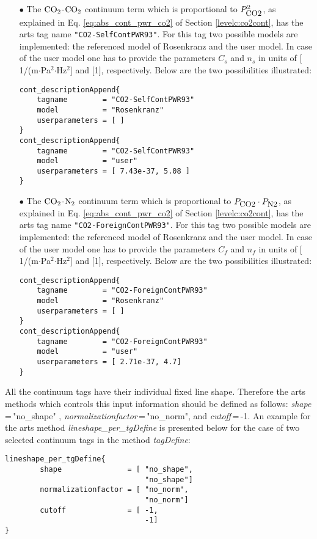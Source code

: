 {\begin{itemize}
\item[$\bullet$] The \cite{pwr:93} $\mbox{CO}_2$-$\mbox{CO}_2$ continuum term which is proportional to 
$P_{\mbox{\rm \small CO2}}^2$, as explained in Eq. \ref{eq:abs_cont_pwr_co2} of Section 
\ref{levelc:co2cont}, has the arts tag name {\tt "CO2-SelfContPWR93"}. For this tag 
two possible models are implemented: the referenced model of Rosenkranz and the 
user model. In case of the user model one has to provide the parameters $C_s$ 
and $n_s$ in units of $[$1/(m$\cdot$Pa$^2$$\cdot$Hz$^2$$]$ and $[$1$]$, 
respectively. Below are the two possibilities illustrated:
\begin{verbatim}
cont_descriptionAppend{
    tagname        = "CO2-SelfContPWR93"
    model          = "Rosenkranz"
    userparameters = [ ]
}
cont_descriptionAppend{
    tagname        = "CO2-SelfContPWR93"
    model          = "user"
    userparameters = [ 7.43e-37, 5.08 ]
}
\end{verbatim}


\item[$\bullet$] The \cite{pwr:93} $\mbox{CO}_2$-$\mbox{N}_2$ continuum term which is proportional to 
$P_{\mbox{\rm \small CO2}}  \cdot P_{\mbox{\rm \small N2}}$, as explained in Eq. \ref{eq:abs_cont_pwr_co2} of Section 
\ref{levelc:co2cont}, has the arts tag name {\tt "CO2-ForeignContPWR93"}. For this tag 
two possible models are implemented: the referenced model of Rosenkranz and the 
user model. In case of the user model one has to provide the parameters $C_f$ 
and $n_f$ in units of $[$1/(m$\cdot$Pa$^2$$\cdot$Hz$^2$$]$ and $[$1$]$, 
respectively. Below are the two possibilities illustrated:
\begin{verbatim}
cont_descriptionAppend{
    tagname        = "CO2-ForeignContPWR93"
    model          = "Rosenkranz"
    userparameters = [ ]
}
cont_descriptionAppend{
    tagname        = "CO2-ForeignContPWR93"
    model          = "user"
    userparameters = [ 2.71e-37, 4.7]
}
\end{verbatim}
\end{itemize}

All the continuum tags have their individual fixed line shape. 
Therefore the arts methods which controls this input information
should be defined as follows:  {\it shape}\,=\,"no\_shape" , 
{\it normalizationfactor}\,=\,"no\_norm", and {\it cutoff}\,=\,-1. An 
example for the arts method {\it lineshape\_per\_tgDefine} is presented 
below for the case of two selected continuum tags in the method 
{\it tagDefine}:
\begin{verbatim}
lineshape_per_tgDefine{
        shape               = [ "no_shape", 
                                "no_shape"]
        normalizationfactor = [ "no_norm", 
                                "no_norm"]
        cutoff              = [ -1,
                                -1]
}
\end{verbatim}

}
